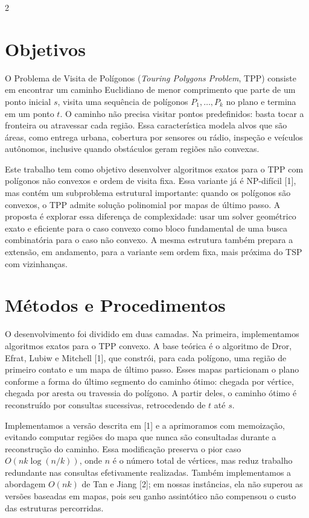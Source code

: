 \documentclass[10pt,a4paper]{article}
\begin{document}
\begin{multicols}{2}

\section{Objetivos}

O Problema de Visita de Polígonos (\textit{Touring Polygons Problem}, TPP) consiste em encontrar um caminho Euclidiano de menor comprimento que parte de um ponto inicial \(s\), visita uma sequência de polígonos \(P_1,\ldots,P_k\) no plano e termina em um ponto \(t\). O caminho não precisa visitar pontos predefinidos: basta tocar a fronteira ou atravessar cada região. Essa característica modela alvos que são áreas, como entrega urbana, cobertura por sensores ou rádio, inspeção e veículos autônomos, inclusive quando obstáculos geram regiões não convexas.

Este trabalho tem como objetivo desenvolver algoritmos exatos para o TPP com polígonos não convexos e ordem de visita fixa. Essa variante já é NP-difícil [1], mas contém um subproblema estrutural importante: quando os polígonos são convexos, o TPP admite solução polinomial por mapas de último passo. A proposta é explorar essa diferença de complexidade: usar um solver geométrico exato e eficiente para o caso convexo como bloco fundamental de uma busca combinatória para o caso não convexo. A mesma estrutura também prepara a extensão, em andamento, para a variante sem ordem fixa, mais próxima do TSP com vizinhanças.

\columnbreak

\section{Métodos e Procedimentos}

O desenvolvimento foi dividido em duas camadas. Na primeira, implementamos algoritmos exatos para o TPP convexo. A base teórica é o algoritmo de Dror, Efrat, Lubiw e Mitchell [1], que constrói, para cada polígono, uma região de primeiro contato e um mapa de último passo. Esses mapas particionam o plano conforme a forma do último segmento do caminho ótimo: chegada por vértice, chegada por aresta ou travessia do polígono. A partir deles, o caminho ótimo é reconstruído por consultas sucessivas, retrocedendo de \(t\) até \(s\).

Implementamos a versão descrita em [1] e a aprimoramos com memoização, evitando computar regiões do mapa que nunca são consultadas durante a reconstrução do caminho. Essa modificação preserva o pior caso \(O(nk\log(n/k))\), onde \(n\) é o número total de vértices, mas reduz trabalho redundante nas consultas efetivamente realizadas. Também implementamos a abordagem \(O(nk)\) de Tan e Jiang [2]; em nossas instâncias, ela não superou as versões baseadas em mapas, pois seu ganho assintótico não compensou o custo das estruturas percorridas.

\end{multicols}
\end{document}

